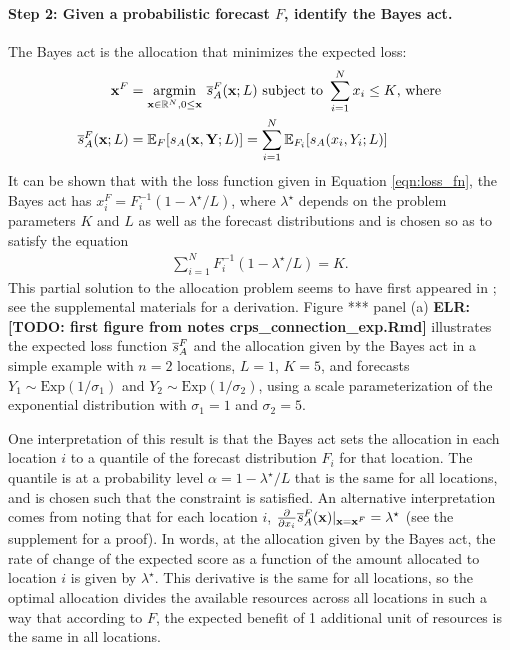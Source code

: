 \documentclass{article}
\def\elr#1{{\color{cyan}\textbf{ELR:[#1]}}}
\begin{document}
\paragraph{Step 2: Given a probabilistic forecast $F$, identify the Bayes act.} The Bayes act is the allocation that minimizes the expected loss:
\begin{align}
    \mathbf{x}^F &= \underset{\mathbf{x}\in \mathbb{R}^N, 0 \leq \mathbf{x}}{\mathrm{arg min}}\,\, \overline{s}_A^F(\mathbf{x}; L) \text{ subject to }
    \sum_{i=1}^N x_i \leq K \text{, where} \label{AP} \\
    \overline{s}_A^F(\mathbf{x}; L) &= \mathbb{E}_{F} [s_A(\mathbf{x}, \mathbf{Y}; L)] = \sum_{i=1}^{N} \mathbb{E}_{F_i}[s_A(x_i, Y_i; L)] \label{eqn:sbar}
\end{align}
It can be shown that with the loss function given in Equation \eqref{eqn:loss_fn}, the Bayes act has $x^F_i = F_i^{-1}(1 - \lambda^{\star}/L)$, where $\lambda^{\star}$ depends on the problem parameters $K$ and $L$ as well as the forecast distributions and is chosen so as to satisfy the equation
\begin{align}
\sum_{i=1}^{N}F_i^{-1}(1 - \lambda^{\star}/L) = K.
\end{align}
This partial solution to the allocation problem seems to have first appeared in \cite{hadleywhitin1963}; see the supplemental materials for a derivation. Figure *** panel (a) \elr{TODO: first figure from notes crps\_connection\_exp.Rmd} illustrates the expected loss function $\overline{s}_A^F$ and the allocation given by the Bayes act in a simple example with $n = 2$ locations, $L = 1$, $K = 5$, and forecasts $Y_1 \sim \text{Exp}(1 / \sigma_1)$ and $Y_2 \sim \text{Exp}(1 / \sigma_2)$, using a scale parameterization of the exponential distribution with $\sigma_1 = 1$ and $\sigma_2 = 5$.

One interpretation of this result is that the Bayes act sets the allocation in each location $i$ to a quantile of the forecast distribution $F_i$ for that location. The quantile is at a probability level $\alpha = 1 - \lambda^{\star}/L$ that is the same for all locations, and is chosen such that the constraint is satisfied. An alternative interpretation comes from noting that for each location $i$, $\frac{\partial}{\partial x_i} \overline{s}_A^F(\mathbf{x}) \vert_{\mathbf{x}=\mathbf{x}^F} = \lambda^{\star}$ (see the supplement for a proof).
In words, at the allocation given by the Bayes act, the rate of change of the expected score as a function of the amount allocated to location $i$ is given by $\lambda^{\star}$.
This derivative is the same for all locations, so the optimal allocation divides the available resources across all locations in such a way that according to $F$, the expected benefit of 1 additional unit of resources is the same in all locations.
\end{document}
